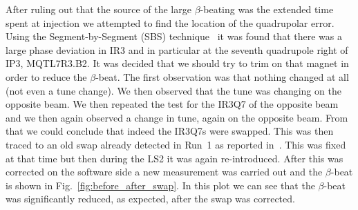 \documentclass{cernatsnote}
\begin{document}
After ruling out that the source of the large $\beta$-beating was the extended time spent at injection we attempted to find the location of the quadrupolar error. Using the Segment-by-Segment (SBS) technique~\cite{first,tomasCERNLargeHadron2010} it was found that there was a large phase deviation in IR3 and in particular at the seventh quadrupole right of IP3, MQTL7R3.B2. It was decided that we should try to trim on that magnet in order to reduce the $\beta$-beat. The first observation was that nothing changed at all (not even a tune change). We then observed that the tune was changing on the opposite beam. We then repeated the test for the IR3Q7 of the opposite beam and we then again observed a change in tune, again on the opposite beam. From that we could conclude that indeed the IR3Q7s were swapped. This was then traced to an old swap already detected in Run~1 as reported in~\cite{first}. This was fixed at that time but then during the LS2 it was again re-introduced. After this was corrected on the software side a new measurement was carried out and the $\beta$-beat is shown in Fig.~\ref{fig:before_after_swap}. In this plot we can see that the $\beta$-beat was significantly reduced, as expected, after the swap was corrected.  
\end{document}
